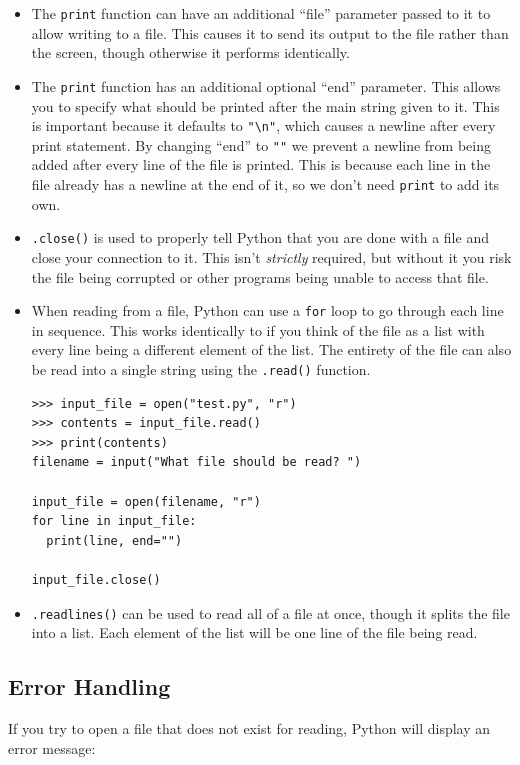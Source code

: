\documentclass[11pt]{cselabheader}
\begin{document}
\begin{itemize}
\item The \lstinline{print} function can have an additional ``file'' parameter
  passed to it to allow writing to a file. This causes it to send its output to
  the file rather than the screen, though otherwise it performs identically.

\item The \lstinline{print} function has an additional optional ``end''
  parameter. This allows you to specify what should be printed after the main
  string given to it. This is important because it defaults to \lstinline{"\n"},
  which causes a newline after every print statement. By changing ``end'' to
  \lstinline{""} we prevent a newline from being added after every line of the
  file is printed. This is because each line in the file already has a newline
  at the end of it, so we don't need \lstinline{print} to add its own.

\item \lstinline{.close()} is used to properly tell Python that you are done
  with a file and close your connection to it. This isn't \emph{strictly}
  required, but without it you risk the file being corrupted or other programs
  being unable to access that file.

\item When reading from a file, Python can use a \lstinline{for} loop to go
  through each line in sequence. This works identically to if you think of the
  file as a list with every line being a different element of the list. The
  entirety of the file can also be read into a single string using the
  \lstinline{.read()} function.

\begin{lstlisting}[style=ipython]
>>> input_file = open("test.py", "r")
>>> contents = input_file.read()
>>> print(contents)
filename = input("What file should be read? ")

input_file = open(filename, "r")
for line in input_file:
  print(line, end="")

input_file.close()
\end{lstlisting}

\item \lstinline{.readlines()} can be used to read all of a file at once, though
  it splits the file into a list. Each element of the list will be one line of
  the file being read.
\end{itemize}


\subsection{Error Handling}
If you try to open a file that does not exist for reading, Python will display
an error message:
\end{document}
